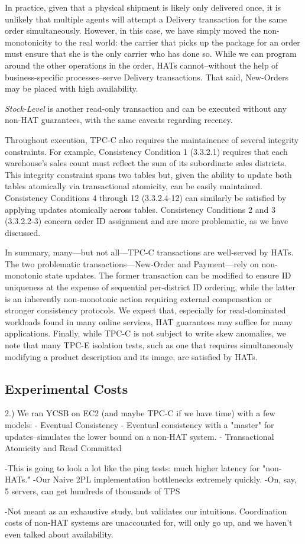 In practice, given that a physical shipment is likely only delivered
once, it is unlikely that multiple agents will attempt a Delivery
transaction for the same order simultaneously. However, in this case,
we have simply moved the non-monotonicity to the real world: the
carrier that picks up the package for an order must ensure that she is
the only carrier who has done so. While we can program around the
other operations in the order, HATs cannot--without the help of
business-specific processes--serve Delivery transactions. That said,
New-Orders may be placed with high availability.

\vspace{.5em}\noindent\textit{Stock-Level} is another read-only
transaction and can be executed without any non-HAT guarantees, with
the same caveats regarding recency.

\vspace{.5em} Throughout execution, TPC-C also requires the
maintainence of several integrity constraints. For example,
Consistency Condition 1 (3.3.2.1) requires that each warehouse's sales
count must reflect the sum of its subordinate sales districts. This
integrity constraint spans two tables but, given the ability to update
both tables atomically via transactional atomicity, can be easily
maintained. Consistency Conditions 4 through 12 (3.3.2.4-12) can
similarly be satisfied by applying updates atomically across
tables. Consistency Conditions 2 and 3 (3.3.2.2-3) concern order ID
assignment and are more problematic, as we have discussed.

In summary, many---but not all---TPC-C transactions are well-served by
HATs. The two problematic transactions---New-Order and Payment---rely
on non-monotonic state updates. The former transaction can be modified
to ensure ID uniqueness at the expense of sequential per-district ID
ordering, while the latter is an inherently non-monotonic action
requiring external compensation or stronger consistency protocols. We
expect that, especially for read-dominated workloads found in many
online services, HAT guarantees may suffice for many
applications. Finally, while TPC-C is not subject to write skew
anomalies, we note that many TPC-E isolation tests, such as one that
requires simultaneously modifying a product description and its image,
are satisfied by HATs.

\subsection{Experimental Costs}


2.) We ran YCSB on EC2 (and maybe TPC-C if we have time) with a few models:
	- Eventual Consistency
	- Eventual consistency with a "master" for updates--simulates the lower bound on a non-HAT system.
	- Transactional Atomicity and Read Committed
	
	-This is going to look a lot like the ping tests: much higher latency for "non-HATs."
	-Our Naive 2PL implementation bottlenecks extremely quickly.
	-On, say, 5 servers, can get hundreds of thousands of TPS

	-Not meant as an exhaustive study, but validates our intuitions. Coordination costs of non-HAT systems are unaccounted for, will only go up, and we haven't even talked about availability.
